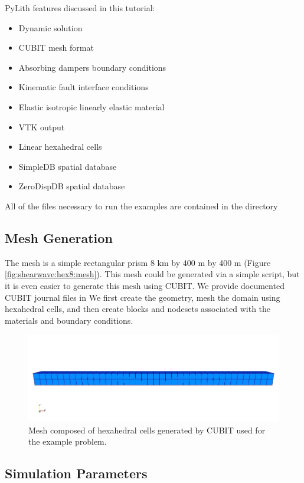 PyLith features discussed in this tutorial:
\begin{itemize}
\item Dynamic solution
\item CUBIT mesh format
\item Absorbing dampers boundary conditions
\item Kinematic fault interface conditions
\item Elastic isotropic linearly elastic material
\item VTK output
\item Linear hexahedral cells
\item SimpleDB spatial database
\item ZeroDispDB spatial database
\end{itemize}
All of the files necessary to run the examples are contained in the
directory 


\subsection{Mesh Generation}

The mesh is a simple rectangular prism 8 km by 400 m by 400 m (Figure
\vref{fig:shearwave:hex8:mesh}). This mesh could be generated via
a simple script, but it is even easier to generate this mesh using
CUBIT. We provide documented CUBIT journal files in 
We first create the geometry, mesh the domain using hexahedral cells,
and then create blocks and nodesets associated with the materials
and boundary conditions.

\begin{figure}
  \includegraphics[scale=0.5]{examples/figs/shearwave_hex8mesh}
  \caption{Mesh composed of hexahedral cells generated by CUBIT used for the
    example problem.}
  \label{fig:shearwave:hex8:mesh}
\end{figure}


\subsection{Simulation Parameters}

